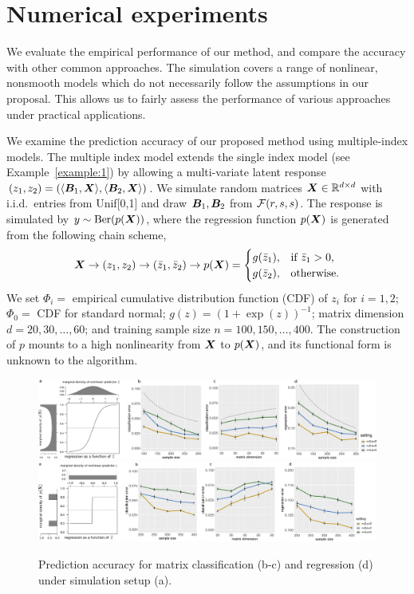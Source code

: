 \documentclass[11pt]{article}
\theoremstyle{definition}
\begin{document}
\vspace{-.5cm}
\section{Numerical experiments}\label{sec:data}
\vspace{-.5cm}
We evaluate the empirical performance of our method, and compare the accuracy with other common approaches. The simulation covers a range of nonlinear, nonsmooth models which do not necessarily follow the assumptions in our proposal. This allows us to fairly assess the performance of various approaches under practical applications. 

We examine the prediction accuracy of our proposed method using multiple-index models. The multiple index model extends the single index model (see Example~\ref{example:1}) by allowing a multi-variate latent response $(z_1,z_2)=\left(\langle \bm B_1, \bm X \rangle,\langle \bm B_2, \bm X \rangle\right)$. We simulate random matrices $\bm X\in\mathbb{R}^{d\times d}$ with i.i.d.\ entries from Unif[0,1] and draw $\bm B_1, \bm B_2$ from $\mathcal{F}(r,s,s)$. The response is simulated by $y\sim \text{Ber}(p(\bm X))$, where the regression function $p(\bm X)$ is generated from the following chain scheme,
\begin{equation}
\bm X \to (z_1,z_2) \to 
(\bar z_1, \bar z_2)
\to p(\bm X)=
\begin{cases}
g(\bar z_1), & \text{if }\bar z_1>0,\\
g(\bar z_2), & \text{otherwise}. 
\end{cases}
\end{equation}
We set $\Phi_i = $ empirical cumulative distribution function (CDF) of $z_i$ for $i=1,2$; $\Phi_0 = $ CDF for standard normal; $g(z)=(1+\exp(z))^{-1}$; matrix dimension $d=20,30,\ldots,60$; and training sample size $n=100, 150, \ldots, 400$. The construction of $p$ mounts to a high nonlinearity from $\bm X$ to $p(\bm X)$, and its functional form is unknown to the algorithm. 

\begin{figure}[H]
\centering
\includegraphics[width=.9\textwidth]{combined.pdf}
\includegraphics[width=.9\textwidth]{combined_steps.pdf}
\caption{Prediction accuracy for matrix classification (b-c) and regression (d) under simulation setup (a). }\label{fig:logistic}
\vspace{-.8cm}
\end{figure}
\end{document}

